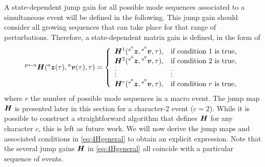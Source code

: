 \documentclass[../DC2019003Bouma.tex]{subfiles}
\begin{document}
A state-dependent jump gain for all possible mode sequences associated to a simultaneous event will be defined in the following. This jump gain should consider all growing sequences that can take place for that range of perturbations. Therefore, a state-dependent matrix gain is defined, in the form of
\begin{align}
\hspace{0cm}^{p \leftarrow a}{\boldsymbol{H}}(\hspace{0cm}^{a}{\boldsymbol{z}}(\tau),\hspace{0cm}^{a}{\boldsymbol{v}}(\tau),\tau) = \left\lbrace\begin{array}{ll}
{\boldsymbol{H}}^1(\hspace{0cm}^{s^0}{\boldsymbol{z}},\hspace{0cm}^{s^0}{\boldsymbol{v}},\tau), & \text{if condition 1 is true},\\
{\boldsymbol{H}}^2(\hspace{0cm}^{s^0}{\boldsymbol{z}},\hspace{0cm}^{s^0}{\boldsymbol{v}},\tau), & \text{if condition 2 is true},\\
\vdots & \vdots\\
{\boldsymbol{H}}^{r}(\hspace{0cm}^{s^0}{\boldsymbol{z}},\hspace{0cm}^{s^0}{\boldsymbol{v}},\tau), & \text{if condition }r\text{ is true},
\end{array}\right.\label{eq:4Hgeneral}
\end{align}
where $r$ the number of possible mode sequences in a macro event. The jump map ${\boldsymbol{H}}$ is presented later in this section for a character-2 event ($c=2$). While it is possible to construct a straightforward algorithm that defines ${\boldsymbol{H}}$ for any character $c$, this is left as future work. We will now derive the jump maps and associated conditions in \eqref{eq:4Hgeneral} to obtain an explicit expression. Note that the several jump gains ${\boldsymbol{H}}$ in \eqref{eq:4Hgeneral} all coincide with a particular sequence of events.
\end{document}
